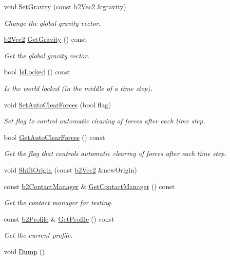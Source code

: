 \begin{DoxyCompactItemize}
\item 
void \mbox{\hyperlink{classb2_world_aeafa43d6580e1dddb0675e672ca2375c}{Set\+Gravity}} (const \mbox{\hyperlink{structb2_vec2}{b2\+Vec2}} \&gravity)
\begin{DoxyCompactList}\small\item\em Change the global gravity vector. \end{DoxyCompactList}\item 
\mbox{\hyperlink{structb2_vec2}{b2\+Vec2}} \mbox{\hyperlink{classb2_world_abd41cdde8eaa3d1c58d2f00eaf688ec3}{Get\+Gravity}} () const
\begin{DoxyCompactList}\small\item\em Get the global gravity vector. \end{DoxyCompactList}\item 
bool \mbox{\hyperlink{classb2_world_a71ca09a3082945a7e77f3f39fb021237}{Is\+Locked}} () const
\begin{DoxyCompactList}\small\item\em Is the world locked (in the middle of a time step). \end{DoxyCompactList}\item 
void \mbox{\hyperlink{classb2_world_aa2bced28ddef5bbb00ed5666e5e9f620}{Set\+Auto\+Clear\+Forces}} (bool flag)
\begin{DoxyCompactList}\small\item\em Set flag to control automatic clearing of forces after each time step. \end{DoxyCompactList}\item 
bool \mbox{\hyperlink{classb2_world_ae1fa8272edf37a4e2a7be08f6e0a8cc6}{Get\+Auto\+Clear\+Forces}} () const
\begin{DoxyCompactList}\small\item\em Get the flag that controls automatic clearing of forces after each time step. \end{DoxyCompactList}\item 
void \mbox{\hyperlink{classb2_world_afc33e20e64252c5be115216051408047}{Shift\+Origin}} (const \mbox{\hyperlink{structb2_vec2}{b2\+Vec2}} \&new\+Origin)
\item 
const \mbox{\hyperlink{classb2_contact_manager}{b2\+Contact\+Manager}} \& \mbox{\hyperlink{classb2_world_a3d321151cd851d39bdc8fe52a5be426c}{Get\+Contact\+Manager}} () const
\begin{DoxyCompactList}\small\item\em Get the contact manager for testing. \end{DoxyCompactList}\item 
const \mbox{\hyperlink{structb2_profile}{b2\+Profile}} \& \mbox{\hyperlink{classb2_world_aec4fb0a888e69e0db7f37a4921761711}{Get\+Profile}} () const
\begin{DoxyCompactList}\small\item\em Get the current profile. \end{DoxyCompactList}\item 
void \mbox{\hyperlink{classb2_world_a73c1fec260d460514edd335d4c235893}{Dump}} ()
\end{DoxyCompactItemize}
